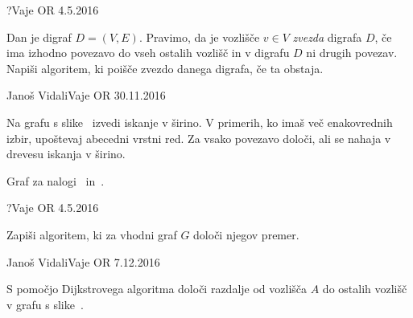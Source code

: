 \begin{naloga}{?}{Vaje OR 4.5.2016}
\begin{vprasanje}[zvezda]
Dan je digraf $D = (V, E)$.
Pravimo, da je vozlišče $v \in V$ {\em zvezda} digrafa $D$,
če ima izhodno povezavo do vseh ostalih vozlišč
in v digrafu $D$ ni drugih povezav.
Napiši algoritem, ki poišče zvezdo danega digrafa, če ta obstaja.
\end{vprasanje}
\begin{odgovor}
\end{odgovor}
\end{naloga}


\begin{naloga}{Janoš Vidali}{Vaje OR 30.11.2016}
\begin{vprasanje}[bfs]
Na grafu s slike~\fig{} izvedi iskanje v širino.
V primerih, ko imaš več ena\-ko\-vred\-nih izbir,
upoštevaj abecedni vrstni red.
Za vsako povezavo določi, ali se nahaja v drevesu iskanja v širino.

\begin{slika}
\pgfslika
\caption{Graf za nalogi~\nal{} in~.}
\end{slika}
\end{vprasanje}
\begin{odgovor}
\end{odgovor}
\end{naloga}


\begin{naloga}{?}{Vaje OR 4.5.2016}
\begin{vprasanje}[premer]
Zapiši algoritem, ki za vhodni graf $G$ določi njegov premer.

\end{vprasanje}
\begin{odgovor}
\end{odgovor}
\end{naloga}


\begin{naloga}{Janoš Vidali}{Vaje OR 7.12.2016}
\begin{vprasanje}[dijkstra]
S pomočjo Dijkstrovega algoritma
določi razdalje od vozlišča $A$ do ostalih vozlišč
v grafu s slike~\fig{}.

\begin{slika}
\pgfslika
{}
\end{slika}
\end{vprasanje}
\begin{odgovor}
\end{odgovor}
\end{naloga}


